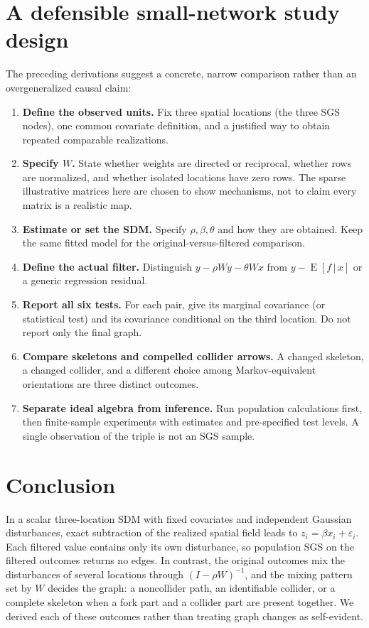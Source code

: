 \documentclass[11pt,a4paper]{article}
\newcommand{\E}{\operatorname{E}}
\newcommand{\given}{\,\vert\,}
\begin{document}
\section{A defensible small-network study design}\label{sec:design}

The preceding derivations suggest a concrete, narrow comparison rather than an overgeneralized causal claim:
\begin{enumerate}[leftmargin=*,label=\arabic*.]
\item \textbf{Define the observed units.} Fix three spatial locations (the three SGS nodes), one common covariate definition, and a justified way to obtain repeated comparable realizations.
\item \textbf{Specify $W$.} State whether weights are directed or reciprocal, whether rows are normalized, and whether isolated locations have zero rows. The sparse illustrative matrices here are chosen to show mechanisms, not to claim every matrix is a realistic map.
\item \textbf{Estimate or set the SDM.} Specify $\rho,\beta,\theta$ and how they are obtained. Keep the same fitted model for the original-versus-filtered comparison.
\item \textbf{Define the actual filter.} Distinguish $y-\rho Wy-\theta Wx$ from $y-\E[f\given x]$ or a generic regression residual.
\item \textbf{Report all six tests.} For each pair, give its marginal covariance (or statistical test) and its covariance conditional on the third location. Do not report only the final graph.
\item \textbf{Compare skeletons and compelled collider arrows.} A changed skeleton, a changed collider, and a different choice among Markov-equivalent orientations are three distinct outcomes.
\item \textbf{Separate ideal algebra from inference.} Run population calculations first, then finite-sample experiments with estimates and pre-specified test levels. A single observation of the triple is not an SGS sample.
\end{enumerate}

\section{Conclusion}

In a scalar three-location SDM with fixed covariates and independent Gaussian disturbances, exact subtraction of the realized spatial field leads to $z_i=\beta x_i+\varepsilon_i$. Each filtered value contains only its own disturbance, so population SGS on the filtered outcomes returns no edges. In contrast, the original outcomes mix the disturbances of several locations through $(I-\rho W)^{-1}$, and the mixing pattern set by $W$ decides the graph: a noncollider path, an identifiable collider, or a complete skeleton when a fork part and a collider part are present together. We derived each of these outcomes rather than treating graph changes as self-evident.
\end{document}
